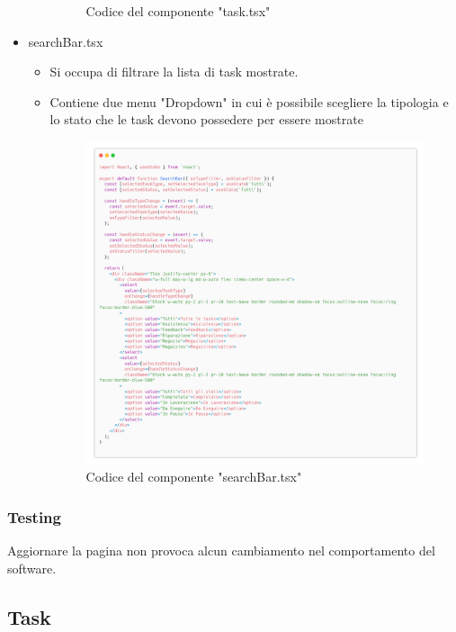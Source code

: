 \documentclass{report}
\begin{document}
\begin{itemize}
\begin{itemize}
\begin{figure}[H]
			Codice del componente "task.tsx"
		\end{figure}
	\end{itemize}
	\item searchBar.tsx
	\begin{itemize}
		\item Si occupa di filtrare la lista di task mostrate.
		\item Contiene due menu "Dropdown" in cui è possibile scegliere la tipologia e lo stato che le task devono possedere per essere mostrate
		\begin{figure}[H]
			\centering\includegraphics[width=1\textwidth]{images/microservizio-task/frontend/searchBar-carbon.png}
			Codice del componente "searchBar.tsx"
		\end{figure}
	\end{itemize}
\end{itemize}

\subsubsection*{Testing}
Aggiornare la pagina non provoca alcun cambiamento nel comportamento del software.

\subsection{Task}
\end{document}
